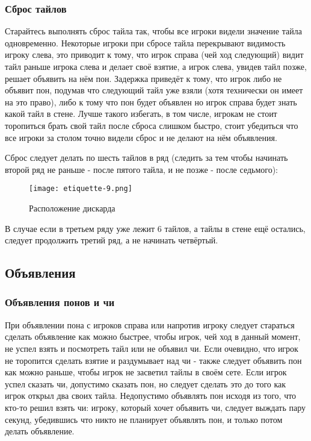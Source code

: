 \subsubsection{Сброс тайлов}

Старайтесь выполнять сброс тайла так, чтобы все игроки видели значение тайла одновременно. Некоторые игроки при сбросе тайла перекрывают видимость игроку слева, это приводит к тому, что игрок справа (чей ход следующий) видит тайл раньше игрока слева и делает своё взятие, а игрок слева, увидев тайл позже, решает объявить на нём пон. Задержка приведёт к тому, что игрок либо не объявит пон, подумав что следующий тайл уже взяли (хотя технически он имеет на это право), либо к тому что пон будет объявлен но игрок справа будет знать какой тайл в стене. Лучше такого избегать, в том числе, игрокам не стоит торопиться брать свой тайл после сброса слишком быстро, стоит убедиться что все игроки за столом точно видели сброс и не делают на нём объявления. 

Сброс следует делать по шесть тайлов в ряд (следить за тем чтобы начинать второй ряд не раньше - после пятого тайла, и не позже - после седьмого):

\begin{figure}[H]
	\centering
	\texttt{[image: etiquette-9.png]}
	\caption{Расположение дискарда}
\end{figure}

В случае если в третьем ряду уже лежит 6 тайлов, а тайлы в стене ещё остались, следует продолжить третий ряд, а не начинать четвёртый.

\subsection{Объявления}

\subsubsection{Объявления понов и чи}

При объявлении пона с игроков справа или напротив игроку следует стараться сделать объявление как можно быстрее, чтобы игрок, чей ход в данный момент, не успел взять и посмотреть тайл или не объявил чи. Если очевидно, что игрок не торопится сделать взятие и раздумывает над чи - также следует объявить пон как можно раньше, чтобы игрок не засветил тайлы в своём сете. Если игрок успел сказать чи, допустимо сказать пон, но следует сделать это до того как игрок открыл два своих тайла. Недопустимо объявлять пон исходя из того, что кто-то решил взять чи: игроку, который хочет объявить чи, следует выждать пару секунд, убедившись что никто не планирует объявлять пон, и только потом делать объявление.

